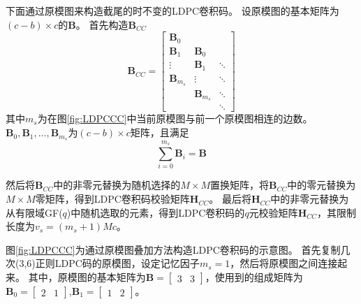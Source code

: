 下面通过原模图来构造截尾的时不变的LDPC卷积码。
设原模图的基本矩阵为$(c-b)\times c$的$\mathbf{B}$。
首先构造$\mathbf{B}_{CC}$
\begin{equation}
    \mathbf{B}_{CC} = \left[
          \begin{array}{ccc}
            \mathbf{B}_0& & \\
            \mathbf{B}_1 & \mathbf{B}_0 & \\
            \vdots & \mathbf{B}_1 & \ddots \\
            \mathbf{B}_{m_s} & \vdots & \ddots \\
             & \mathbf{B}_{m_s} & \ddots \\
             & & \ddots 
          \end{array} \right]
\end{equation}
其中$m_s$为在图\ref{fig:LDPCCC}中当前原模图与前一个原模图相连的边数。$\mathbf{B}_0 , \mathbf{B}_1 , \dots , \mathbf{B}_{m_s}$为$(c-b)\times c$矩阵，且满足
\begin{equation}
\sum^{m_s}_{i=0} \mathbf{B}_i = \mathbf{B}
\end{equation}

然后将$\mathbf{B}_{CC}$中的非零元替换为随机选择的$M \times M$置换矩阵，将$\mathbf{B}_{CC}$中的零元替换为$M \times M$零矩阵，得到LDPC卷积码校验矩阵$\mathbf{H}_{CC}$。
最后将$\mathbf{H}_{CC}$中的非零元替换为从有限域GF($q$)中随机选取的元素，得到LDPC卷积码的$q$元校验矩阵$\mathbf{H}_{CC}$，其限制长度为$v_s=(m_s+1)Mc$。

图\ref{fig:LDPCCC}为通过原模图叠加方法构造LDPC卷积码的示意图。
首先复制几次(3,6)正则LDPC码的原模图，设定记忆因子$m_s=1$，然后将原模图之间连接起来。
其中，原模图的基本矩阵为$ \mathbf{B} = [\begin{array}{cc} 3&3 \end{array}]$，使用到的组成矩阵为$\mathbf{B}_0 = [\begin{array}{cc} 2&1 \end{array}]$,$\mathbf{B}_1 = [\begin{array}{cc} 1&2 \end{array}]$。

